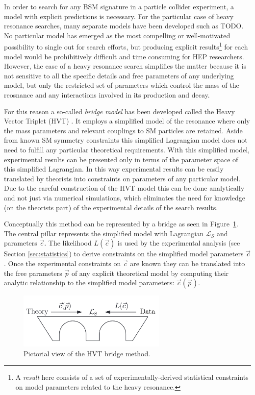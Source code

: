In order to search for any BSM signature in a particle collider experiment, a model with explicit predictions is necessary.
For the particular case of heavy resonance searches, many separate models have been developed such as TODO. %
No particular model has emerged as the most compelling or well-motivated possibility to single out for search efforts, but producing explicit results\footnote{A \textit{result} here consists of a set of experimentally-derived statistical constraints on model parameters related to the heavy resonance.} for each model would be prohibitively difficult and time consuming for HEP researchers.
However, the case of a heavy resonance search simplifies the matter because it is not sensitive to all the specific details and free parameters of any underlying model, but only the restricted set of parameters which control the mass of the reosnance and any interactions involved in its production and decay.

For this reason a so-called \textit{bridge model} has been developed called the Heavy Vector Triplet (HVT) \cite{Pappadopulo:2014qza}.
It employs a simplified model of the resonance where only the mass parameters and relevant couplings to SM particles are retained.
Aside from known SM symmetry constraints this simplified Lagrangian model does not need to fulfill any particular theoretical requirements.
With this simplified model, experimental results can be presented only in terms of the parameter space of this simplified Lagrangian.
In this way experimental results can be easily translated by theorists into constraints on parameters of any particular model.
Due to the careful construction of the HVT model this can be done analytically and not just via numerical simulations, which eliminates the need for knowledge (on the theorists part) of the experimental details of the search results.

Conceptually this method can be represented by a bridge as seen in Figure~\ref{fig:hvt_bridge}.
The central pillar represents the simplified model with Lagrangian $\mathcal{L}_S$ and parameters $\vec{c}$.
The likelihood $L(\vec{c})$ is used by the experimental analysis (see Section \ref{sec:statistics}) to derive constraints on the simplified model parameters $\vec{c}$.
Once the experimental constraints on $\vec{c}$ are known they can be translated into the free parameters $\vec{p}$ of any explicit theoretical model by computing their analytic relationship to the simplified model parameters: $\vec{c}(\vec{p})$.

\begin{figure}
	\centering
	\includegraphics[width=0.65\textwidth,origin=c]{hvt_bridge}
	\caption{
	Pictorial view of the HVT bridge method. \cite{Pappadopulo:2014qza}
	}
	\label{fig:hvt_bridge}
\end{figure}

